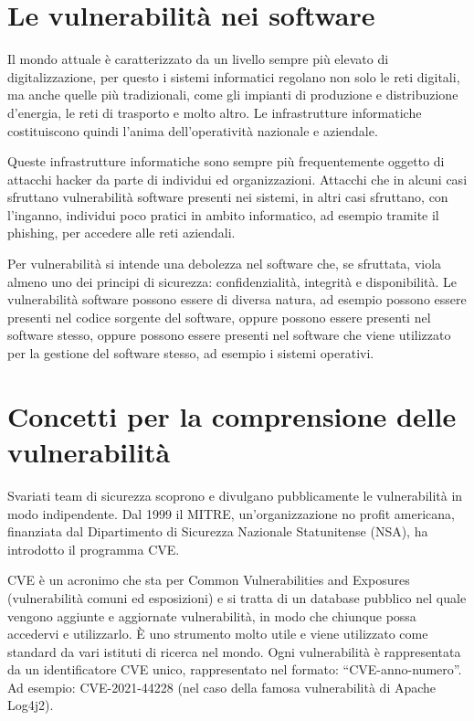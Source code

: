 \section{Le vulnerabilità nei software}
Il mondo attuale è caratterizzato da un livello sempre più elevato di
digitalizzazione, per questo i sistemi informatici regolano non solo
le reti digitali, ma anche quelle più tradizionali, come gli impianti di
produzione e distribuzione d’energia, le reti di trasporto e molto altro. 
Le infrastrutture informatiche costituiscono quindi l’anima dell’operatività 
nazionale e aziendale.

Queste infrastrutture informatiche sono sempre più frequentemente oggetto 
di attacchi hacker da parte di individui ed organizzazioni. 
Attacchi che in alcuni casi sfruttano vulnerabilità software presenti nei 
sistemi, in altri casi sfruttano, con l’inganno, individui poco pratici in 
ambito informatico, ad esempio tramite il phishing, per accedere alle reti 
aziendali.

Per vulnerabilità si intende una debolezza nel software che, se sfruttata, 
viola almeno uno dei principi di sicurezza: confidenzialità, integrità e 
disponibilità. Le vulnerabilità software possono essere di diversa natura,
ad esempio possono essere presenti nel codice sorgente del software, oppure 
possono essere presenti nel software stesso, oppure possono essere presenti 
nel software che viene utilizzato per la gestione del software stesso, 
ad esempio i sistemi operativi.


\section{Concetti per la comprensione delle vulnerabilità}
Svariati team di sicurezza scoprono e divulgano pubblicamente le vulnerabilità
in modo indipendente. Dal 1999 il MITRE, un'organizzazione no profit 
americana, finanziata dal Dipartimento di Sicurezza Nazionale 
Statunitense (NSA), ha introdotto il programma CVE.

CVE è un acronimo che sta per Common Vulnerabilities and Exposures
(vulnerabilità comuni ed esposizioni) e si tratta di un database pubblico nel 
quale vengono aggiunte e aggiornate vulnerabilità, in modo che chiunque possa 
accedervi e utilizzarlo. 
È uno strumento molto utile e viene utilizzato come standard da vari istituti 
di ricerca nel mondo. Ogni vulnerabilità è rappresentata da un identificatore 
CVE unico, rappresentato nel formato: “CVE-anno-numero”. 
Ad esempio: CVE-2021-44228 (nel caso della famosa vulnerabilità 
di Apache Log4j2).

